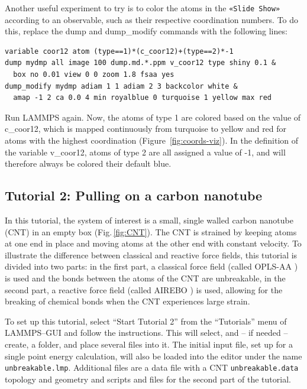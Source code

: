 \documentclass[9pt,tutorial]{livecoms}
\newcommand{\lmpcmd}[1]{\hspace{0pt}\colorbox{listing}{\textcolor{command}{\small{#1}}}\hspace{0pt}} %
\newcommand{\flecmd}[1]{\textcolor{command}{\texttt{#1}}} %
\newcommand{\guicmd}[1]{\textcolor{command}{\texttt{«#1»}}} %
\begin{document}
Another useful experiment to try is to color the atoms in the \guicmd{Slide Show}
according to an observable, such as their respective coordination
numbers.  To do this, replace the
\lmpcmd{dump} and \lmpcmd{dump\_modify} commands with the following lines:
\begin{lstlisting}
variable coor12 atom (type==1)*(c_coor12)+(type==2)*-1
dump mydmp all image 100 dump.md.*.ppm v_coor12 type shiny 0.1 &
  box no 0.01 view 0 0 zoom 1.8 fsaa yes
dump_modify mydmp adiam 1 1 adiam 2 3 backcolor white &
  amap -1 2 ca 0.0 4 min royalblue 0 turquoise 1 yellow max red
\end{lstlisting}
Run LAMMPS again.  Now, the atoms of type 1 are colored based on the value
of \lmpcmd{c\_coor12}, which is mapped continuously from turquoise to yellow
and red for atoms with the highest coordination (Figure~\ref{fig:coords-viz}).
In the definition of the variable \lmpcmd{v\_coor12}, atoms of type 2 are
all assigned a value of -1, and will therefore always be colored their default blue. 

\subsection{Tutorial 2: Pulling on a carbon nanotube}
\label{carbon-nanotube-label}

In this tutorial, the system of interest is a small, single walled
carbon nanotube (CNT) in an empty box (Fig.\,\ref{fig:CNT}).  The CNT is
strained by keeping atoms at one end in place and moving atoms at the
other end with constant velocity.  To illustrate the difference between
classical \cite{typelabel_paper} and reactive force fields, this
tutorial is divided into two parts: in the first part, a classical force
field (called OPLS-AA \cite{jorgensenDevelopmentTestingOPLS1996}) is
used and the bonds between the atoms of the CNT are unbreakable, in the
second part, a reactive force field (called AIREBO
\cite{stuart2000reactive}) is used, allowing for the breaking of
chemical bonds when the CNT experiences large strain.

To set up this tutorial, select ``Start Tutorial 2'' from the
``Tutorials'' menu of LAMMPS--GUI and follow the instructions.  This
will select, and -- if needed -- create, a folder, and place several
files into it.  The initial input file, set up for a single point energy
calculation, will also be loaded into the editor under the name
\flecmd{unbreakable.lmp}.  Additional files are a data file with a CNT
\flecmd{unbreakable.data} topology and geometry and scripts and files
for the second part of the tutorial.
\end{document}
